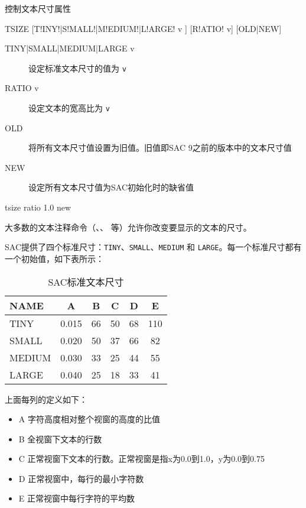 \label{cmd:tsize}

控制文本尺寸属性

\begin{SACSTX}
TSIZE [T!INY!|S!MALL!|M!EDIUM!|L!ARGE! v ] [R!ATIO! v] [OLD|NEW]
\end{SACSTX}

\begin{description}
\item [TINY|SMALL|MEDIUM|LARGE v] 设定标准文本尺寸的值为 \texttt{v}
\item [RATIO v] 设定文本的宽高比为 \texttt{v}
\item [OLD] 将所有文本尺寸值设置为旧值。旧值即SAC 9之前的版本中的文本尺寸值
\item [NEW] 设定所有文本尺寸值为SAC初始化时的缺省值
\end{description}

\begin{SACDFT}
tsize ratio 1.0 new
\end{SACDFT}

大多数的文本注释命令（、、
等）允许你改变要显示的文本的尺寸。

SAC提供了四个标准尺寸：\texttt{TINY}、\texttt{SMALL}、\texttt{MEDIUM}
和 \texttt{LARGE}。每一个标准尺寸都有一个初始值，如下表所示：
\begin{table}[!ht]
\centering
\caption{SAC标准文本尺寸}
\begin{tabular}{lccccc}
\toprule
NAME	&	A	&	B	&	C	&	D	&	E	\\
\midrule
TINY 	& 0.015 &   66 	&  50  	&	68  &	110	\\
SMALL	& 0.020 &	50  &  37  	&	66  &	82	\\
MEDIUM  & 0.030 &	33  &  25  	&	44  &	55	\\
LARGE	& 0.040 &	25  &  18  	&	33  &	41	\\
\bottomrule
\end{tabular}
\end{table}

上面每列的定义如下：
\begin{itemize}
\item A 字符高度相对整个视窗的高度的比值
\item B 全视窗下文本的行数
\item C 正常视窗下文本的行数。正常视窗是指x为0.0到1.0，y为0.0到0.75
\item D 正常视窗中，每行的最小字符数
\item E 正常视窗中每行字符的平均数
\end{itemize}

